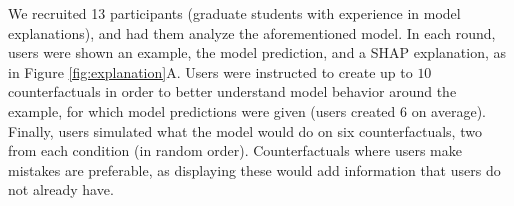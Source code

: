 We recruited 13 participants (graduate students with experience in model explanations), and had them analyze the aforementioned \qqp model. In each round, users were shown an example, the model prediction, and a SHAP explanation, as in Figure \ref{fig:explanation}A. Users were instructed to create up to $10$ counterfactuals in order to better understand model behavior around the example, for which model predictions were given (users created $6$ on average). 
Finally, users simulated what the model would do on six counterfactuals, two from each condition (in random order). Counterfactuals where users make mistakes are preferable, as displaying these would add information that users do not already have.



